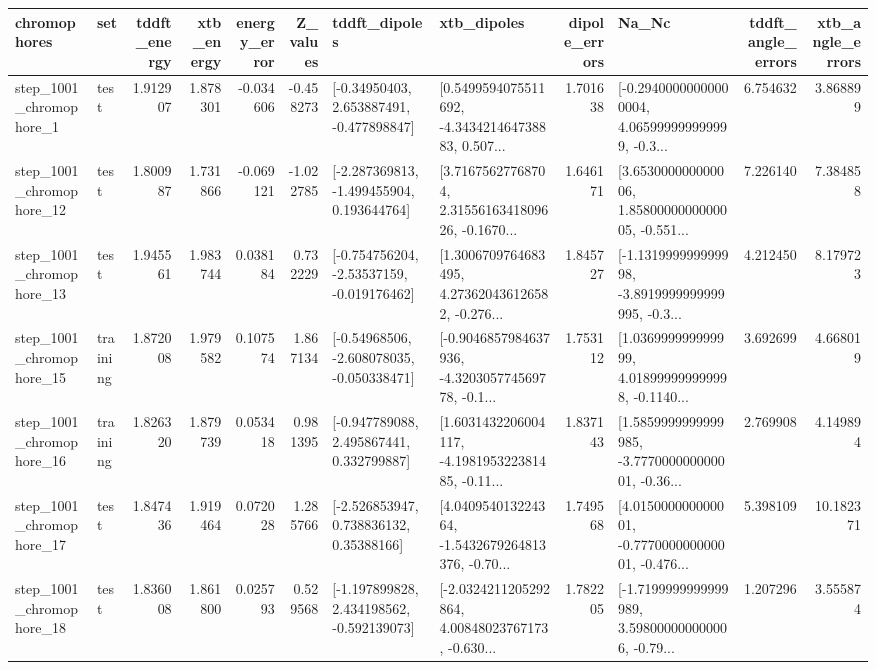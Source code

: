 \begin{tabular}{llrrrrllrlrr}
\toprule
             chromophores &       set &  tddft\_energy &  xtb\_energy &  energy\_error &  Z\_values &                               tddft\_dipoles &                                        xtb\_dipoles &  dipole\_errors &                                              Na\_Nc &  tddft\_angle\_errors &  xtb\_angle\_errors \\
\midrule
  step\_1001\_chromophore\_1 &      test &      1.912907 &    1.878301 &     -0.034606 & -0.458273 &    [-0.34950403, 2.653887491, -0.477898847] &  [0.5499594075511692, -4.343421464738883, 0.507... &       1.701638 &  [-0.29400000000000004, 4.065999999999999, -0.3... &            6.754632 &          3.868899 \\
 step\_1001\_chromophore\_12 &      test &      1.800987 &    1.731866 &     -0.069121 & -1.022785 &   [-2.287369813, -1.499455904, 0.193644764] &  [3.71675627768704, 2.3155616341809626, -0.1670... &       1.646171 &  [3.653000000000006, 1.8580000000000005, -0.551... &            7.226140 &          7.384858 \\
 step\_1001\_chromophore\_13 &      test &      1.945561 &    1.983744 &      0.038184 &  0.732229 &   [-0.754756204, -2.53537159, -0.019176462] &  [1.3006709764683495, 4.273620436126582, -0.276... &       1.845727 &  [-1.131999999999998, -3.8919999999999995, -0.3... &            4.212450 &          8.179723 \\
 step\_1001\_chromophore\_15 &  training &      1.872008 &    1.979582 &      0.107574 &  1.867134 &   [-0.54968506, -2.608078035, -0.050338471] &  [-0.9046857984637936, -4.320305774569778, -0.1... &       1.753112 &  [1.036999999999999, 4.018999999999998, -0.1140... &            3.692699 &          4.668019 \\
 step\_1001\_chromophore\_16 &  training &      1.826320 &    1.879739 &      0.053418 &  0.981395 &    [-0.947789088, 2.495867441, 0.332799887] &  [1.6031432206004117, -4.198195322381485, -0.11... &       1.837143 &  [1.5859999999999985, -3.777000000000001, -0.36... &            2.769908 &          4.149894 \\
 step\_1001\_chromophore\_17 &      test &      1.847436 &    1.919464 &      0.072028 &  1.285766 &     [-2.526853947, 0.738836132, 0.35388166] &  [4.040954013224364, -1.5432679264813376, -0.70... &       1.749568 &  [4.015000000000001, -0.777000000000001, -0.476... &            5.398109 &         10.182371 \\
 step\_1001\_chromophore\_18 &      test &      1.836008 &    1.861800 &      0.025793 &  0.529568 &   [-1.197899828, 2.434198562, -0.592139073] &  [-2.0324211205292864, 4.00848023767173, -0.630... &       1.782205 &  [-1.7199999999999989, 3.598000000000006, -0.79... &            1.207296 &          3.555874 \\

\end{tabular}
